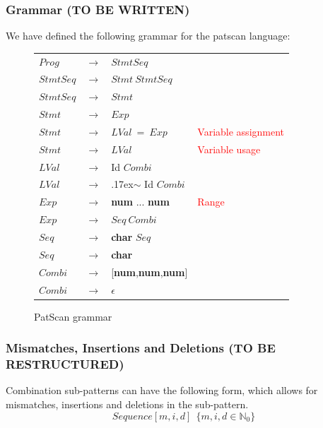 \documentclass[12pt]{article}
\theoremstyle{definition}
\begin{document}
\subsubsection{Grammar (TO BE WRITTEN)}
\label{Patscan grammar}

We have defined the following grammar for the patscan language:

\begin{figure}[H]
\begin{tabular}{|lcll|}
	\hline
	$Prog$ & $\rightarrow$ & $StmtSeq$ & \\
	$StmtSeq$ & $\rightarrow$ & $Stmt\ StmtSeq$ & \\
	$StmtSeq$ & $\rightarrow$ & $Stmt$ & \\
	$Stmt$ & $\rightarrow$ & $Exp$ & \\
	$Stmt$ & $\rightarrow$ & $LVal\ =\ Exp$ &  \textcolor{red}{Variable assignment} \\
	$Stmt$ & $\rightarrow$ & $LVal$ & \textcolor{red}{Variable usage} \\
	$LVal$ & $\rightarrow$ & Id $Combi$ & \\
	$LVal$ & $\rightarrow$ & {\raise.17ex\hbox{$\scriptstyle\mathtt{\sim}$}} Id $Combi$ & \\
	$Exp$ & $\rightarrow$ & \textbf{num} ... \textbf{num} & \textcolor{red}{Range} \\
	$Exp$ & $\rightarrow$ & $Seq\ Combi$ & \\
	$Seq$ & $\rightarrow$ & \textbf{char} $Seq$ & \\
	$Seq$ & $\rightarrow$ & \textbf{char} & \\
	$Combi$ & $\rightarrow$ & [\textbf{num},\textbf{num},\textbf{num}] & \\
	$Combi$ & $\rightarrow$ & $\epsilon$ & \\
	\hline
\end{tabular}
\caption{PatScan grammar}
\end{figure}

\subsubsection{Mismatches, Insertions and Deletions (TO BE RESTRUCTURED)}

Combination sub-patterns can have the following form, which allows for mismatches, insertions and deletions in the sub-pattern. 
\begin{equation}
	Sequence[m, i, d] \ \ \{m, i, d \in \mathbb{N}_0 \}
\end{equation} 
\end{document}
